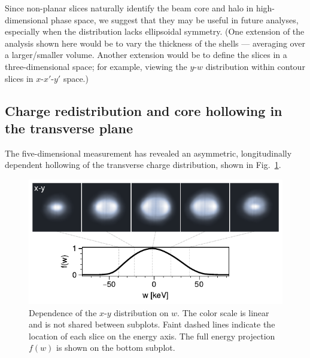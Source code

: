 \documentclass[%
 reprint,
 amsmath,amssymb,
 aps,
prstab,
]{revtex4-2}
\begin{document}
Since non-planar slices naturally identify the beam core and halo in high-dimensional phase space, we suggest that they may be useful in future analyses, especially when the distribution lacks ellipsoidal symmetry. (One extension of the analysis shown here would be to vary the thickness of the shells --- averaging over a larger/smaller volume. Another extension would be to define the slices in a three-dimensional space; for example, viewing the $y$-$w$ distribution within contour slices in $x$-$x'$-$y'$ space.)



\subsection{Charge redistribution and core hollowing in the transverse plane}\label{sec:results-b}


The five-dimensional measurement has revealed an asymmetric, longitudinally dependent hollowing of the transverse charge distribution, shown in Fig.~\ref{fig:wslices}.
%
\begin{figure}
    \centering
    \includegraphics[width=\columnwidth]{fig7.pdf}
    \caption{Dependence of the $x$-$y$ distribution on $w$. The color scale is linear and is not shared between subplots. Faint dashed lines indicate the location of each slice on the energy axis. The full energy projection $f(w)$ is shown on the bottom subplot.}
    \label{fig:wslices}
\end{figure}
%
\end{document}
